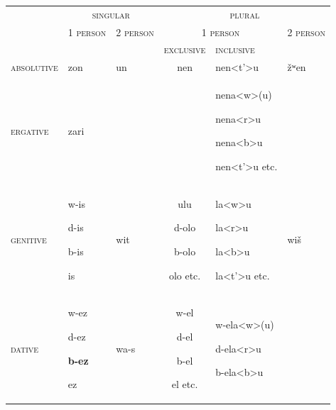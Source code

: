 \documentclass[output=paper]{langscibook}
\begin{document}
\begin{tabularx}{\textwidth}{XXXXXX}

\lsptoprule
\multicolumn{1}{c}{~

} & \multicolumn{2}{c}{ \textsc{singular}} & \multicolumn{3}{c}{ \textsc{plural}}\\
& \textsc{1} \textsc{person}  & \textsc{2} \textsc{person}  & \multicolumn{2}{c}{ \textsc{1} \textsc{person}} & \textsc{2} \textsc{person} \\
&  &  & \multicolumn{1}{c}{\textsc{exclusive}} & \textsc{inclusive} & \\
\textsc{absolutive} & zon & un & \multicolumn{1}{c}{nen}  & nen<t’>u & žʷen \\
\textsc{ergative} & zari &  &  & nena<w>(u)

nena<r>u

nena<b>u

nen<t’>u  etc. & \\
\textsc{genitive}  & %
w-is      

d-is   

b-is      

is & wit & \multicolumn{1}{c}{ulu

d-olo

b-olo

olo      etc.}  & la<w>u

la<r>u

la<b>u

la<t’>u     etc. & wiš \\
\textsc{dative} & %
w-ez 

d-ez  

\textbf{b-ez}  

ez & wa-s & \multicolumn{1}{c}{w-el

d-el

b-el

el         etc.} & w-ela<w>(u)

d-ela<r>u

b-ela<b>u


\end{tabularx}
\end{document}
